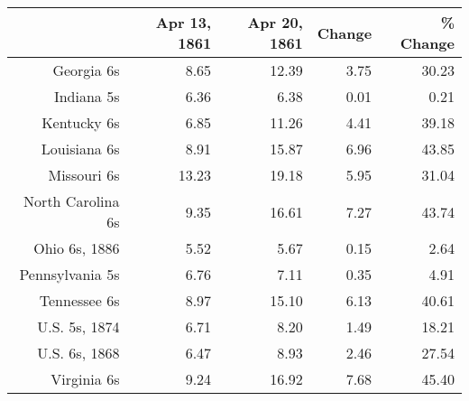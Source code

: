 \begin{tabular}{rrrrr}
  \hline
 & Apr 13, 1861 & Apr 20, 1861 & Change & \% Change \\ 
  \hline
Georgia 6s & 8.65 & 12.39 & 3.75 & 30.23 \\ 
  Indiana 5s & 6.36 & 6.38 & 0.01 & 0.21 \\ 
  Kentucky 6s & 6.85 & 11.26 & 4.41 & 39.18 \\ 
  Louisiana 6s & 8.91 & 15.87 & 6.96 & 43.85 \\ 
  Missouri 6s & 13.23 & 19.18 & 5.95 & 31.04 \\ 
  North Carolina 6s & 9.35 & 16.61 & 7.27 & 43.74 \\ 
  Ohio 6s, 1886 & 5.52 & 5.67 & 0.15 & 2.64 \\ 
  Pennsylvania 5s & 6.76 & 7.11 & 0.35 & 4.91 \\ 
  Tennessee 6s & 8.97 & 15.10 & 6.13 & 40.61 \\ 
  U.S. 5s, 1874 & 6.71 & 8.20 & 1.49 & 18.21 \\ 
  U.S. 6s, 1868 & 6.47 & 8.93 & 2.46 & 27.54 \\ 
  Virginia 6s & 9.24 & 16.92 & 7.68 & 45.40 \\ 
   \hline
\end{tabular}
